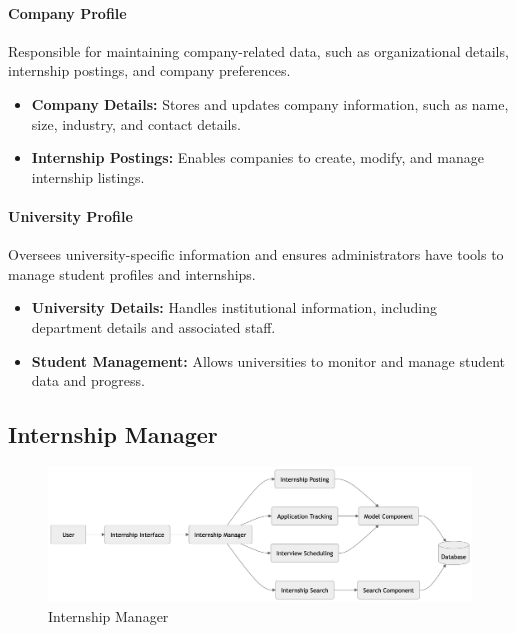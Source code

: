 \paragraph{Company Profile}
Responsible for maintaining company-related data, such as organizational details, internship postings, and company preferences.
\begin{itemize}
    \item \textbf{Company Details:} Stores and updates company information, such as name, size, industry, and contact details.
    \item \textbf{Internship Postings:} Enables companies to create, modify, and manage internship listings.
\end{itemize}

\paragraph{University Profile}
Oversees university-specific information and ensures administrators have tools to manage student profiles and internships.
\begin{itemize}
    \item \textbf{University Details:} Handles institutional information, including department details and associated staff.
    \item \textbf{Student Management:} Allows universities to monitor and manage student data and progress.
\end{itemize}

\subsection{Internship Manager}
\label{subsec:internship_manager}
\begin{figure}[H]
    \begin{center}
        \includegraphics[width=0.82\linewidth]{JhaBhatiaSharma/imagesDD/InternshipManager.png}
        \caption{Internship Manager}
        \label{fig:internshipmanager}%
    \end{center}
\end{figure}

